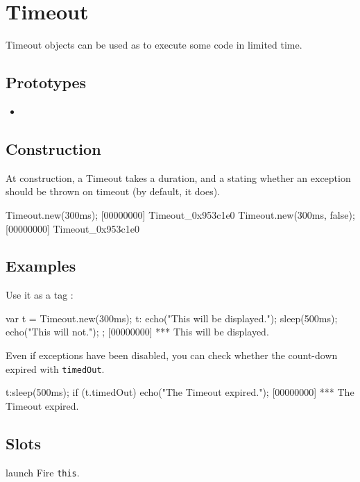 \section{Timeout}

Timeout objects can be used as  to execute some
code in limited time.

\subsection{Prototypes}
\begin{itemize}
\item {}
\end{itemize}

\subsection{Construction}
At construction, a Timeout takes a duration, and a 
stating whether an exception should be thrown on timeout (by default,
it does).

\begin{urbiscript}[firstnumber=last]
Timeout.new(300ms);
[00000000] Timeout_0x953c1e0
Timeout.new(300ms, false);
[00000000] Timeout_0x953c1e0
\end{urbiscript}

\subsection{Examples}

Use it as a tag :

\begin{urbiscript}[firstnumber=last]
var t = Timeout.new(300ms);
t:{
  echo("This will be displayed.");
  sleep(500ms);
  echo("This will not.");
};
[00000000] *** This will be displayed.
\end{urbiscript}

Even if exceptions have been disabled, you can check whether the
count-down expired with \lstinline|timedOut|.

\begin{urbiscript}[firstnumber=last]
t:sleep(500ms);
if (t.timedOut)
  echo("The Timeout expired.");
[00000000] *** The Timeout expired.
\end{urbiscript}

\subsection{Slots}
\begin{urbiscriptapi}
\item[launch]
  Fire \lstinline|this|.

\end{urbiscriptapi}

